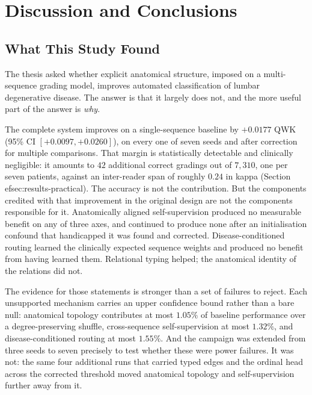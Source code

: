 \documentclass[12pt,a4paper]{report}
\begin{document}
\chapter{Discussion and Conclusions}
\label{ch:discussion}

\section{What This Study Found}
\label{sec:disc-summary}

The thesis asked whether explicit anatomical structure, imposed on a
multi-sequence grading model, improves automated classification of lumbar
degenerative disease. The answer is that it largely does not, and the more
useful part of the answer is \emph{why}.

The complete system improves on a single-sequence baseline by $+0.0177$ QWK
(95\% CI $[+0.0097, +0.0260]$), on every one of seven seeds and after correction
for multiple comparisons. That margin is statistically detectable and clinically
negligible: it amounts to $42$ additional correct gradings out of $7{,}310$, one
per seven patients, against an inter-reader span of roughly $0.24$ in kappa
(Section~
ef{sec:results-practical}). The accuracy is not the contribution. But the components credited with that improvement in
the original design are not the components responsible for it. Anatomically
aligned self-supervision produced no measurable benefit on any of three axes,
and continued to produce none after an initialisation confound that handicapped
it was found and corrected.
Disease-conditioned routing learned the clinically expected sequence weights
and produced no benefit from having learned them. Relational typing helped;
the anatomical identity of the relations did not.

The evidence for those statements is stronger than a set of failures to reject.
Each unsupported mechanism carries an upper confidence bound rather than a bare
null: anatomical topology contributes at
most $1.05\%$ of baseline performance over a degree-preserving shuffle,
cross-sequence self-supervision at most $1.32\%$, and disease-conditioned routing
at most $1.55\%$. And the campaign was extended from three seeds to seven
precisely to test whether these were power failures. It was not: the same four
additional runs that carried typed edges and the ordinal head across the
corrected threshold moved anatomical topology and self-supervision further away
from it.
\end{document}
